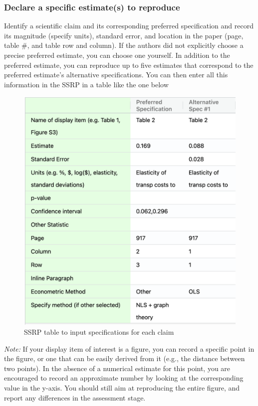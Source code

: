 \documentclass[
  openany]{book}
\begin{document}
\hypertarget{declare-a-specific-estimates-to-reproduce}{%
\subsubsection*{Declare a specific estimate(s) to reproduce}\label{declare-a-specific-estimates-to-reproduce}}

Identify a scientific claim and its corresponding preferred specification and record its magnitude (specify units), standard error, and location in the paper (page, table \#, and table row and column). If the authors did not explicitly choose a precise preferred estimate, you can choose one yourself. In addition to the preferred estimate, you can reproduce up to five estimates that correspond to the preferred estimate's alternative specifications. You can then enter all this information in the SSRP in a table like the one below

\begin{figure}

{\centering \includegraphics[width=0.8\linewidth]{estimates} 

}

\caption{SSRP table to input specifications for each claim}\label{fig:estim}
\end{figure}

\emph{Note:} If your display item of interest is a figure, you can record a specific point in the figure, or one that can be easily derived from it (e.g., the distance between two points). In the absence of a numerical estimate for this point, you are encouraged to record an approximate number by looking at the corresponding value in the y-axis. You should still aim at reproducing the entire figure, and report any differences in the assessment stage.
\end{document}
